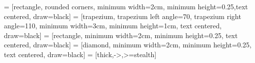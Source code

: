 
\usepackage[utf8]{vietnam}
\usepackage[utf8]{inputenc}
\usepackage{amsmath}
\usepackage{verbatim}
\usepackage{amsfonts}
\usepackage{tikz}
\usetikzlibrary{arrows,automata,shapes.geometric}
\usepackage{amssymb}
\usepackage{graphicx}
\usepackage{listings}
\usepackage{textcomp}
\usepackage[hidelinks]{hyperref}
\setlength{\parskip}{1em}
\setlength{\parindent}{0pt}
\renewcommand{\familydefault}{\sfdefault}
\usepackage[left=2cm,right=2cm,top=2cm,bottom=2cm]{geometry}

 \renewcommand\lstlistingname{Quelltext} %

\lstset{ %
	language=C,
	basicstyle=\small\sffamily,
	numbers=left,
 	numberstyle=\tiny,
	frame=tb,
	tabsize=4,
	columns=fixed,
	showstringspaces=false,
	showtabs=false,
	keepspaces,
}
 = [rectangle, rounded corners, minimum width=2cm, minimum height=0.25,text centered, draw=black]
 = [trapezium, trapezium left angle=70, trapezium right angle=110, minimum width=3cm, minimum height=1cm, text centered, draw=black]
 = [rectangle, minimum width=2cm, minimum height=0.25, text centered, draw=black]
 = [diamond, minimum width=2cm, minimum height=0.25, text centered, draw=black]
 = [thick,->,>=stealth]
